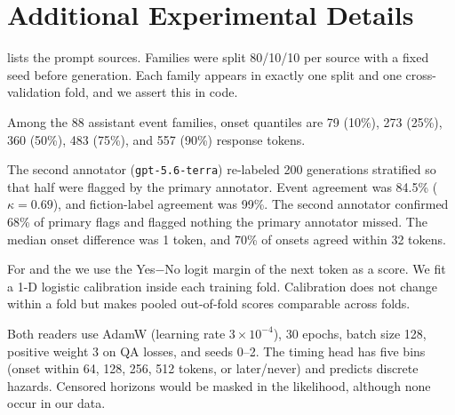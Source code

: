 \section{Additional Experimental Details}
\label{app:details}

 lists the prompt sources. Families were split 80/10/10 per source with a fixed seed before generation. Each family appears in exactly one split and one cross-validation fold, and we assert this in code.

\begin{table}[h]
\centering
\caption{Prompt families after annotation (987 of 1,000; 13 annotator calls failed).}
\label{tab:sources}
\end{table}

Among the 88 assistant event families, onset quantiles are 79 (10\%), 273 (25\%), 360 (50\%), 483 (75\%), and 557 (90\%) response tokens.

The second annotator (\texttt{gpt-5.6-terra}) re-labeled 200 generations stratified so that half were flagged by the primary annotator. Event agreement was 84.5\% ($\kappa{=}0.69$), and fiction-label agreement was 99\%. The second annotator confirmed 68\% of primary flags and flagged nothing the primary annotator missed. The median onset difference was 1 token, and 70\% of onsets agreed within 32 tokens.

For \selfreport and the \ao we use the Yes$-$No logit margin of the next token as a score. We fit a 1-D logistic calibration inside each training fold. Calibration does not change \auroc within a fold but makes pooled out-of-fold scores comparable across folds.

Both readers use AdamW (learning rate $3{\times}10^{-4}$), 30 epochs, batch size 128, positive weight 3 on QA losses, and seeds 0--2. The \forecast timing head has five bins (onset within 64, 128, 256, 512 tokens, or later/never) and predicts discrete hazards. Censored horizons would be masked in the likelihood, although none occur in our data.

